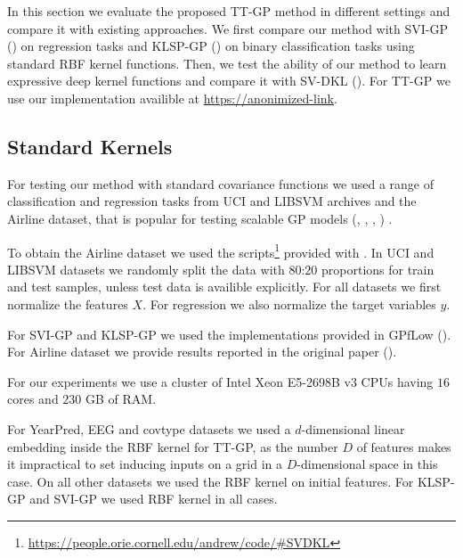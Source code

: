 In this section we evaluate the proposed TT-GP method in different settings
and compare it with existing approaches. We first compare our method with 
SVI-GP (\citet{hensman2013}) on regression tasks and KLSP-GP 
(\citet{hensman2015}) on binary classification tasks using standard RBF kernel
functions. 
Then, we test the ability of our method to learn 
expressive deep kernel functions and compare it with SV-DKL 
(\citet{wilson2016stochastic}). For TT-GP we use our implementation availible at
\url{https://anonimized-link}.

\subsection{Standard Kernels}

For testing our method with standard covariance functions we used a range of
classification and regression tasks from UCI and LIBSVM archives and the 
Airline dataset, that is popular for testing scalable GP models 
(\citet{hensman2013}, \citet{hensman2015}, \citet{wilson2016stochastic},
\citet{cutajar2016})
.

To obtain the Airline dataset we used the scripts\footnote{\url{https://people.orie.cornell.edu/andrew/code/\#SVDKL}}
provided with \citet{wilson2016stochastic}. In UCI and LIBSVM datasets we randomly split
the data with $80$:$20$ proportions for train and test samples, unless test data
is availible explicitly. 
For all datasets we first normalize the features $X$. For regression we also
normalize the target variables $y$. 

For SVI-GP and KLSP-GP we used the implementations provided in GPfLow  
(\citet{GPflow2016}). For Airline dataset we provide results reported in
the original paper (\citet{hensman2015}). 

For our experiments we use
a cluster of Intel Xeon E5-2698B v3 CPUs having $16$ cores and $230$ GB
of RAM.

For YearPred, EEG and covtype datasets we used
a $d$-dimensional linear embedding inside the RBF kernel for TT-GP, as the number $D$ of features makes it
impractical to set inducing inputs on a grid in a $D$-dimensional space in this 
case. On all other datasets we used the RBF kernel on initial features.
For KLSP-GP and SVI-GP we used RBF kernel in all cases.


